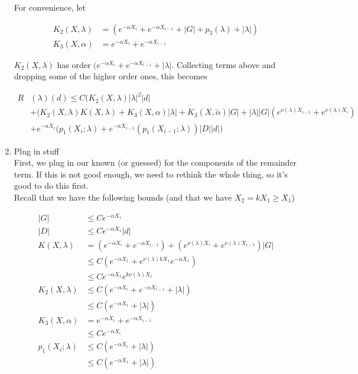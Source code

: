\documentclass[12pt]{article}
\begin{document}
\begin{enumerate}
For convenience, let

\begin{align*}
K_2(X, \lambda) &= (e^{-\alpha X_i} + e^{-\alpha X_{i-1}} + |G| + p_3(\lambda) + |\lambda|) \\
K_3(X, \alpha) &= e^{-\alpha X_i} + e^{-\alpha X_{i-1}}
\end{align*}

$K_2(X, \lambda)$ has order $(e^{-\alpha X_i} + e^{-\alpha X_{i-1}} + |\lambda|$. Collecting terms above and dropping some of the higher order ones, this becomes

\begin{align*}
R&(\lambda)(d) \leq C \Big(
K_2(X, \lambda)|\lambda|^2 |d| \\
&+(K_2(X, \lambda)K(X, \lambda) + K_3(X, \alpha)|\lambda| + K_3(X, \tilde{\alpha})|G| + |\lambda| |G| (e^{\nu(\lambda)X_{i-1}} + e^{\nu(\lambda)X_i})\\
&+ e^{-\alpha X_i}(p_1(X_i; \lambda) + e^{-\alpha X_{i-1}}(p_1(X_{i-1}; \lambda))|D||d| \Big)
\end{align*}

\item Plug in stuff \\

First, we plug in our known (or guessed) for the components of the remainder term. If this is not good enough, we need to rethink the whole thing, so it's good to do this first.\\

Recall that we have the following bounds (and that we have $X_2 = k X_1 \geq X_1$)

\begin{align*}
|G| &\leq C e^{-\alpha X_1} \\
|D| &\leq C e^{-\alpha X_1} |d| \\
K(X, \lambda) &= (e^{-\alpha X_i} + e^{-\alpha X_{i-1}}) + (e^{\nu(\lambda)X_i} + e^{\nu(\lambda)X_{i-1}})|G| \\
&\leq C(e^{-\alpha X_1} + e^{\nu(\lambda)k X_1} e^{-\alpha X_1} ) \\
&\leq C e^{-\alpha X_1} e^{k \nu(\lambda) X_1} \\
K_2(X, \lambda) &\leq C(e^{-\alpha X_i} + e^{-\alpha X_{i-1}} + |\lambda|) \\
&\leq C(e^{-\alpha X_1} + |\lambda|) \\
K_3(X, \alpha) &= e^{-\alpha X_i} + e^{-\alpha X_{i-1}} \\
&\leq C e^{-\alpha X_i} \\
p_1(X_i; \lambda) &\leq C (e^{-\alpha X_i} + |\lambda|) \\
&\leq C (e^{-\alpha X_1} + |\lambda|) \\
\end{align*}


\end{enumerate}
\end{document}
